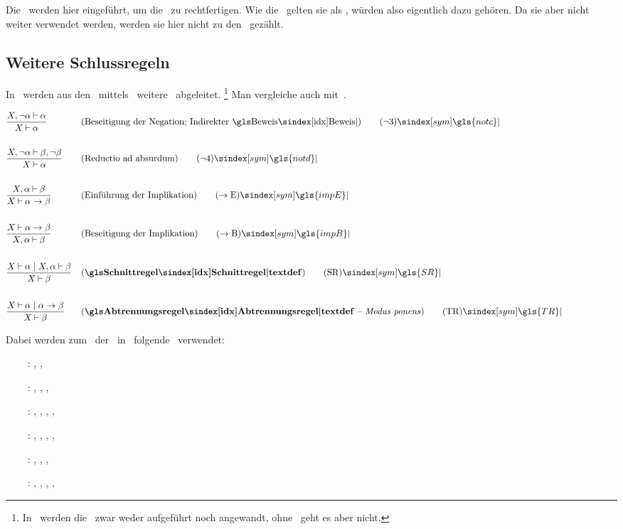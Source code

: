 {Die \Identitaetsregeln\ werden hier eingeführt, um die \Substitution\ zu rechtfertigen.
Wie die \Basisregeln\ gelten sie als \Axiome, würden also eigentlich dazu gehören.
Da sie aber nicht weiter verwendet werden, werden sie hier nicht zu den \Basisregeln\ gezählt.

\subsection{Weitere Schlussregeln}%
\label{sub:weitereSchlussregeln}

In~\cite{bib:Rautenberg} werden aus den \Basisregeln\ mittels \zulaessigerTransformationen\ weitere \Schlussregeln\ abgeleitet.%
\footnote{%
	In~\cite{bib:Rautenberg} werden die \Identitaetsregeln\ zwar weder aufgeführt noch angewandt, ohne \Substitution\ geht es aber nicht.
}
Man vergleiche auch mit~\cite{bib:NatuerlichesSchliessen}.

\begin{align}
	& \frac{X,\lnot\alpha\derive\alpha}{X\derive\alpha}
	& & (\text{Beseitigung der Negation; Indirekter \Beweis})
	\tag{\notc} \sym{\gls{notc}} \label{def:notc}
	\\\\
	& \frac{X,\lnot\alpha\derive\beta,\lnot\beta}{X\derive\alpha}
	& & (\text{Reductio ad absurdum})
	\tag{\notd} \sym{\gls{notd}} \label{def:notd}
	\\\\
	& \frac{X,\alpha\derive\beta}{X\derive\alpha\limp\beta}
	& & (\text{Einführung der Implikation})
	\tag{\impE} \sym{\gls{impE}} \label{def:impE}
	\\\\
	& \frac{X\derive\alpha\limp\beta}{X,\alpha\derive\beta}
	& & (\text{Beseitigung der Implikation})
	\tag{\impB} \sym{\gls{impB}} \label{def:impB}
	\\\\
	& \frac{X\derive\alpha \srand X,\alpha\derive\beta}{X\derive\beta}
	& & (\text{\definition{\Schnittregel}})
	\tag{\SR} \sym{\gls{SR}} \label{def:SR}
	\\\\
	& \frac{X\derive\alpha \srand \alpha\limp\beta}{X\derive\beta}
	& & (\text{\definition{\Abtrennungsregel} -- \emph{Modus ponens}})
	\tag{\TR} \sym{\gls{TR}} \label{def:TR}
	\formulatoleft
\end{align}

Dabei werden zum \Beweis\ der \Schlussregeln\ in~\cite{bib:Rautenberg} folgende \Basisregeln\ verwendet:
\begin{itemize}
	\renewcommand*{\itemindent}{1cm}
	\renewcommand*{\labelsep}{5pt}
	\item[\notc~:] \AR, \MR,        \notb
	\item[\notd~:] \AR, \MR, \nota, \notb
	\item[\impE~:] \AR, \MR, \nota, \notb, \andE
	\item[\impB~:] \AR, \MR, \nota, \notb       , \andB
	\item[\SR  ~:] \AR, \MR, \nota, \notb
	\item[\TR  ~:] \AR, \MR, \nota, \notb, \andE
\end{itemize}
%
}
